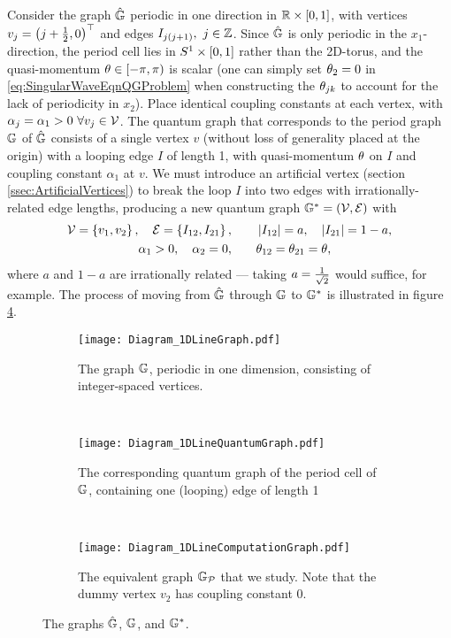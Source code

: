 Consider the graph $\hat{\mathbb{G}}$ periodic in one direction in $\mathbb{R}\times\left[ 0,1 \right]$, with vertices $v_j = \left( j + \frac{1}{2}, 0 \right)^\top$ and edges $I_{j\bracs{j+1}}, \ j\in\integers$.
Since $\hat{\mathbb{G}}$ is only periodic in the $x_1$-direction, the period cell lies in $S^1\times\left[ 0,1 \right]$ rather than the 2D-torus, and the quasi-momentum $\theta\in\left[-\pi,\pi\right)$ is scalar (one can simply set $\theta_2=0$ in \eqref{eq:SingularWaveEqnQGProblem} when constructing the $\theta_{jk}$ to account for the lack of periodicity in $x_2$).
Place identical coupling constants at each vertex, with $\alpha_j = \alpha_1>0 \ \forall v_j\in\mathcal{V}$.
The quantum graph that corresponds to the period graph $\mathbb{G}$ of $\hat{\mathbb{G}}$ consists of a single vertex $v$ (without loss of generality placed at the origin) with a looping edge $I$ of length 1, with quasi-momentum $\theta$ on $I$ and coupling constant $\alpha_1$ at $v$.
We must introduce an artificial vertex (section \ref{ssec:ArtificialVertices}) to break the loop $I$ into two edges with irrationally-related edge lengths, producing a new quantum graph $\mathbb{G}^*=\left( \mathcal{V}, \mathcal{E} \right)$ with
\begin{align*}
	\mathcal{V} = \left\{  v_1 , v_2  \right\}, \quad \mathcal{E} = \left\{  I_{12}, I_{21}  \right\},
	&\qquad \left\lvert I_{12} \right\rvert = a, \quad \left\lvert I_{21} \right\rvert = 1-a,  \\
	\alpha_1 >0, \quad \alpha_2 = 0,
	&\qquad \theta_{12} = \theta_{21} = \theta,
\end{align*}
where $a$ and $1-a$ are irrationally related --- taking $a = \frac{1}{\sqrt{2}}$ would suffice, for example.
The process of moving from $\hat{\mathbb{G}}$ through $\mathbb{G}$ to $\mathbb{G}^*$ is illustrated in figure \ref{fig:Diagram_1DExample}.
\begin{figure}[t!]
	\centering
	\begin{subfigure}[t]{0.3\textwidth}
		\centering
		\texttt{[image: Diagram\_1DLineGraph.pdf]}
		\caption[]{\label{fig:Diagram_1DLineGraph} The graph $\mathbb{G}$, periodic in one dimension, consisting of integer-spaced vertices.}
	\end{subfigure}
	~
	\begin{subfigure}[t]{0.3\textwidth}
		\centering
		\texttt{[image: Diagram\_1DLineQuantumGraph.pdf]}
		\caption[]{\label{fig:Diagram_1DLineQuantumGraph} The corresponding quantum graph of the period cell of $\mathbb{G}$, containing one (looping) edge of length 1}
	\end{subfigure}
	~
	\begin{subfigure}[t]{0.3\textwidth}
		\centering
		\texttt{[image: Diagram\_1DLineComputationGraph.pdf]}	
		\caption[]{\label{fig:Diagram_1DLineComputationGraph} The equivalent graph $\mathbb{G}_{\mathcal{P}}$ that we study. Note that the dummy vertex $v_2$ has coupling constant 0.}
	\end{subfigure}
	\caption[The 1D chain graph studied in the example of section \ref{ssec:Example1DLoop}.]{\label{fig:Diagram_1DExample} The graphs $\hat{\mathbb{G}}$, $\mathbb{G}$, and $\mathbb{G}^*$.}
\end{figure} \newline

